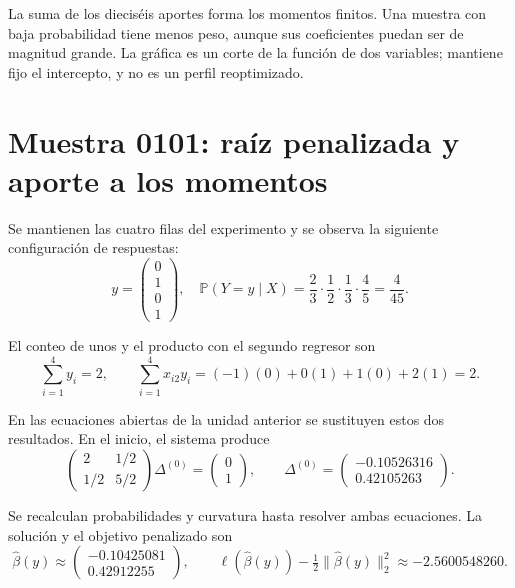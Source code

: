 \documentclass[11pt,a4paper]{article}
\newcommand{\Prob}{\mathbb P}
\begin{document}
La suma de los dieciséis aportes forma los momentos finitos.
Una muestra con baja probabilidad tiene menos peso,
aunque sus coeficientes puedan ser de magnitud grande.
La gráfica es un corte de la función de dos variables;
mantiene fijo el intercepto, y no es un perfil reoptimizado.
\endgroup

\clearpage
\section{Muestra 0101: raíz penalizada y aporte a los momentos}\label{logit130}
\begingroup\small
\setlength{\abovedisplayskip}{4pt}\setlength{\belowdisplayskip}{4pt}
Se mantienen las cuatro filas del experimento y se observa
la siguiente configuración de respuestas:
\[
y=\begin{pmatrix}0\\1\\0\\1\end{pmatrix},\quad \Prob(Y=y\mid X)=\frac{2}{3}\cdot\frac{1}{2}\cdot\frac{1}{3}\cdot\frac{4}{5}=\frac{4}{45}.
\]

El conteo de unos y el producto con el segundo regresor son
\[
\sum_{i=1}^4 y_i=2,\qquad\sum_{i=1}^4x_{i2}y_i=(-1)(0)+0(1)+1(0)+2(1)=2.
\]

En las ecuaciones abiertas de la unidad anterior se sustituyen
estos dos resultados. En el inicio, el sistema produce
\[
\begin{pmatrix}2&1/2\\1/2&5/2\end{pmatrix}\Delta^{(0)}=\begin{pmatrix}0\\1\end{pmatrix},\qquad\Delta^{(0)}=\begin{pmatrix}-0.10526316\\0.42105263\end{pmatrix}.
\]

Se recalculan probabilidades y curvatura hasta resolver
ambas ecuaciones. La solución y el objetivo penalizado son
\[
\widehat\beta(y)\approx\begin{pmatrix}-0.10425081\\0.42912255\end{pmatrix},\qquad \ell(\widehat\beta(y))-\tfrac12\|\widehat\beta(y)\|_2^2\approx-2.5600548260.
\]
\end{document}
